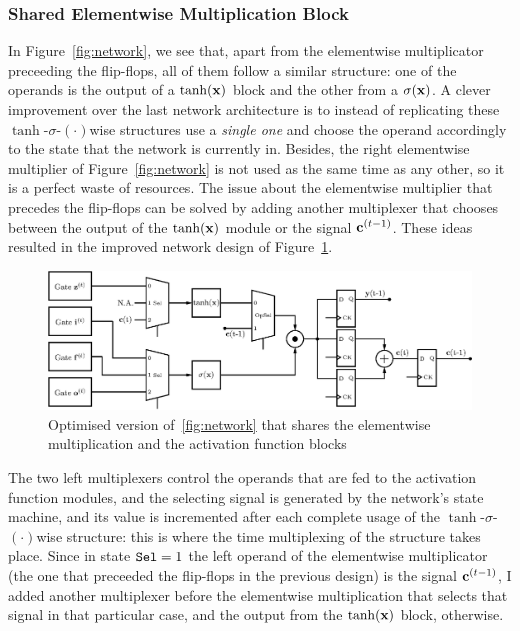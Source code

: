 \subsubsection{Shared Elementwise Multiplication Block}\label{sec:struct-fullpar}
In Figure~\ref{fig:network}, we see that, apart from the elementwise multiplicator preceeding the flip-flops, all of them follow a similar structure: one of the operands is the output of a $\tanh(\mathbf{x})$ block and the other from a $\sigma(\mathbf{x})$. A clever improvement over the last network architecture is to instead of replicating these $\tanh$-$\sigma$-$(\cdot)$wise structures use a \emph{single one} and choose the operand accordingly to the state that the network is currently in. Besides, the right elementwise multiplier of Figure~\ref{fig:network} is not used as the same time as any other, so it is a perfect waste of resources. The issue about the elementwise multiplier that precedes the flip-flops can be solved by adding another multiplexer that chooses between the output of the $\tanh(\mathbf{x})$ module or the signal $\mathbf{c}^{(t-1)}$. These ideas resulted in the improved network design of Figure~\ref{fig:network-opt}.

\begin{figure}
    \centering
    \includegraphics[width=0.9\linewidth]{figures/network-opt.eps}
    \caption[Optimised version of~\ref{fig:network} that shares the elementwise multiplication and the activation function blocks]{Optimised version of~\ref{fig:network} that shares the elementwise multiplication and the activation function blocks}
    \label{fig:network-opt}
\end{figure}
The two left multiplexers control the operands that are fed to the activation function modules, and the selecting signal is generated by the network's state machine, and its value is incremented after each complete usage of the $\tanh$-$\sigma$-$(\cdot)$wise  structure: this is where the time multiplexing of the structure takes place. Since in state $\verb+Sel+=1$ the left operand of the elementwise multiplicator (the one that preceeded the flip-flops in the previous design) is the signal $\mathbf{c}^{(t-1)}$, I added another multiplexer before the elementwise multiplication that selects that signal in that particular case, and the output from the $\tanh(\mathbf{x})$ block, otherwise.

